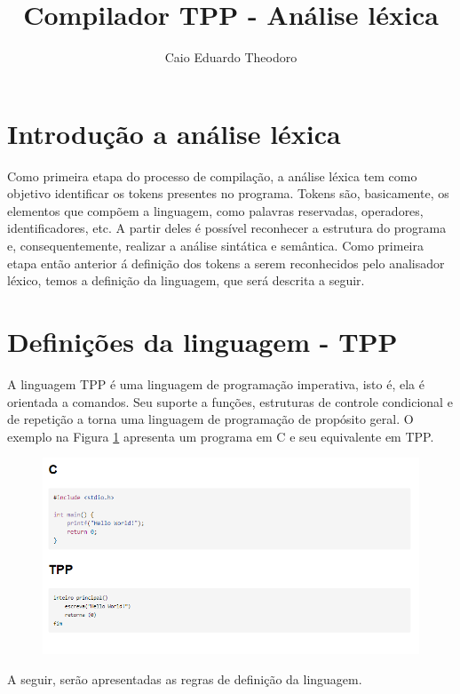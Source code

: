 \documentclass[12pt]{article}
\title{Compilador TPP - Análise léxica}
\author{Caio Eduardo Theodoro}
\begin{document}
 

\vspace{1cm}
\section{Introdução a análise léxica}

Como primeira etapa do processo de compilação, a análise léxica tem como objetivo identificar os tokens presentes no programa.
Tokens são, basicamente, os elementos que compõem a linguagem, como palavras reservadas, operadores, identificadores, etc. A partir deles é possível reconhecer a estrutura do programa e, consequentemente, realizar a análise sintática e semântica.
Como primeira etapa então anterior á definição dos tokens a serem reconhecidos pelo analisador léxico, temos a definição da linguagem, que será descrita a seguir.

\vspace{1cm}
\section{Definições da linguagem - TPP}

A linguagem TPP é uma linguagem de programação imperativa, isto é, ela é orientada a comandos. Seu suporte a funções, estruturas de controle condicional e de repetição a torna uma linguagem de programação de propósito geral.
O exemplo na Figura \ref{fig:f1} apresenta um programa em C e seu equivalente em TPP. 

 
      \begin{figure}[h!]
        \centering
         \includegraphics[scale=0.8]{images/c_tpp.png}
        \label{fig:f1}
        \end{figure}

A seguir, serão apresentadas as regras de definição da linguagem.
\end{document}
